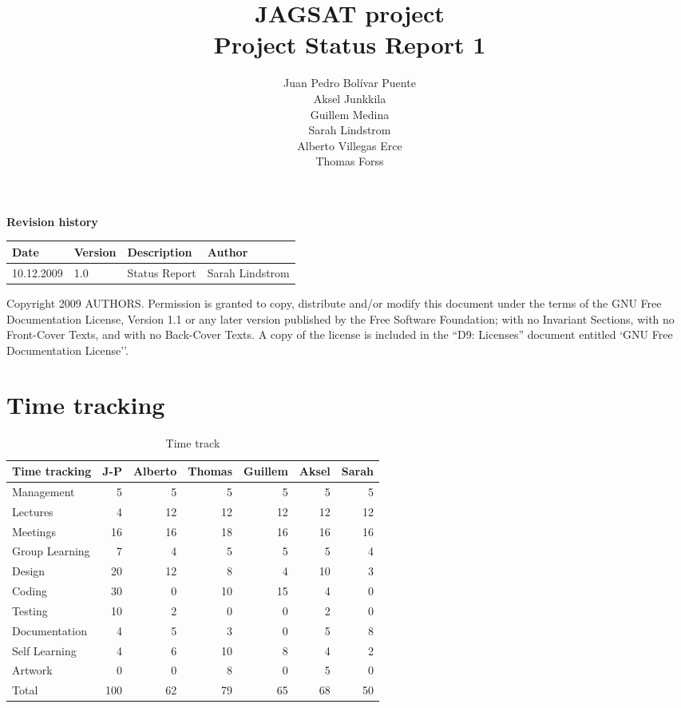 \documentclass[12pt,a4paper]{article}
\title{\large JAGSAT project\\\huge Project Status Report 1}
\author{
  Juan Pedro Bolívar Puente\\ 
  Aksel Junkkila\\
  Guillem Medina\\ 
  Sarah Lindstrom\\ 
  Alberto Villegas Erce\\ 
  Thomas Forss
}
\begin{document}
\maketitle

\begin{center}
\textbf{Revision history}

\begin{tabular}{ l | l | l | l }
Date			&Version	&Description		&Author\\\hline\hline
10.12.2009	&1.0		&Status Report		&Sarah Lindstrom
\end{tabular}
\label{tab:rev}
\end{center}

\vfill
Copyright 2009 AUTHORS.
Permission is granted to copy, distribute and/or modify this document under the terms of the GNU Free Documentation License, Version 1.1 or any later version published by the Free Software Foundation;  with no Invariant Sections, with no Front-Cover Texts, and with no Back-Cover Texts. A copy of the license is included in the ``D9: Licenses''  document entitled `GNU Free Documentation License''.

\pagebreak
\tableofcontents
\pagebreak

\section{Time tracking}

\begin{table}[h!]
\small
\begin{tabular}{ l | r | r | r | r | r | r}
Time tracking	&J-P	&Alberto	&Thomas	&Guillem	&Aksel	&Sarah\\\hline\hline
Management	&5	&5		&5		&5		&5		&5\\
Lectures		&4	&12		&12		&12		&12		&12\\
Meetings		&16	&16		&18		&16		&16		&16\\
Group Learning&7	&4		&5		&5		&5		&4\\
Design		&20	&12		&8		&4		&10		&3\\
Coding		&30	&0		&10		&15		&4		&0\\
Testing		&10	&2		&0		&0		&2		&0\\
Documentation&4	&5		&3		&0		&5		&8\\
Self Learning	&4	&6		&10		&8		&4		&2\\
Artwork		&0	&0		&8		&0		&5		&0\\
Total			&100&62		&79		&65		&68		&50
\end{tabular}
\caption{Time track}
\label{tab:timetrack}
\end{table}
\end{document}
